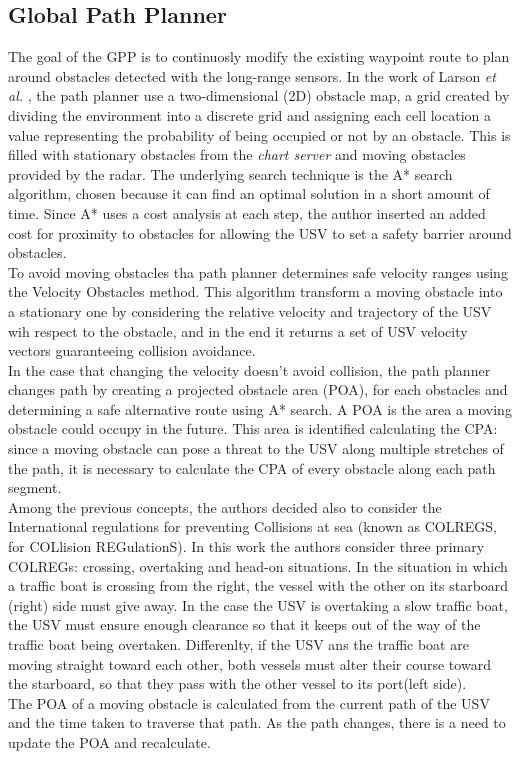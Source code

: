 \documentclass[journal]{IEEEtran}
\begin{document}
  \subsection{Global Path Planner} \label{gpp}
  The goal of the GPP is to continuosly modify the existing waypoint route to plan around obstacles detected with the long-range sensors. In the work of Larson \textit{et al.} \cite{Larson2007,Larson2007a}, the path planner use a two-dimensional (2D) obstacle map, a grid created by dividing the environment into a discrete grid and assigning each cell location a value representing the probability of being occupied or not by an obstacle. This is filled with stationary obstacles from the \textit{chart server} and moving obstacles provided by the radar. The underlying search technique is the A* search algorithm, chosen because it can find an optimal solution in a short amount of time. Since A* uses a cost analysis at each step, the author inserted an added cost for proximity to obstacles for allowing the USV to set a safety barrier around obstacles.\\
  To avoid moving obstacles tha path planner determines safe velocity ranges using the Velocity Obstacles method. This algorithm transform a moving obstacle into a stationary one by considering the relative velocity and trajectory of the USV wih respect to the obstacle, and in the end it returns a set of USV velocity vectors guaranteeing collision avoidance.\\
  In the case that changing the velocity doesn't avoid collision, the path planner changes path by creating a projected obstacle area (POA), for each obstacles and determining a safe alternative route using A* search. A POA is the area a moving obstacle could occupy in the future. This area is identified calculating the CPA: since a moving obstacle can pose a threat to the USV along multiple stretches of the path, it is necessary to calculate the CPA of every obstacle along each path segment.\\
  Among the previous concepts, the authors decided also to consider the International regulations for preventing Collisions at sea (known as COLREGS, for COLlision REGulationS). In this work the authors consider three primary COLREGs: crossing, overtaking and head-on situations. In the situation in which a traffic boat is crossing from the right, the vessel with the other on its starboard (right) side must give away. In the case the USV is overtaking a slow traffic boat, the USV must ensure enough clearance so that it keeps out of the way of the traffic boat being overtaken. Differenlty, if the USV ans the traffic boat are moving straight toward each other, both vessels must alter their course toward the starboard, so that they pass with the other vessel to its port(left side).\\
  The POA of a moving obstacle is calculated from the current path of the USV and the time taken to traverse that path. As the path changes, there is a need to update the POA and recalculate.\\
\end{document}
